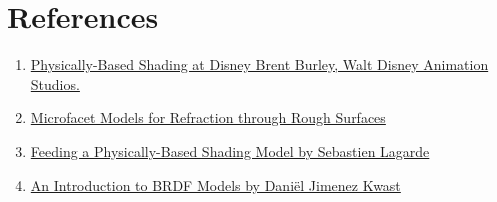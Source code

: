 \section{References}

\begin{enumerate}
\item \href{https://disney-animation.s3.amazonaws.com/library/s2012_pbs_disney_brdf_notes_v2.pdf}{Physically-Based Shading at Disney Brent Burley, Walt Disney Animation Studios.}
\item \href{http://www.cs.cornell.edu/~srm/publications/EGSR07-btdf.pdf}{Microfacet Models for Refraction through Rough Surfaces}
\item \href{http://seblagarde.wordpress.com/2011/08/17/feeding-a-physical-based-lighting-mode/}{Feeding a Physically-Based Shading Model by Sebastien Lagarde}
\item \href{http://hmi.ewi.utwente.nl/verslagen/capita-selecta/CS-Jimenez-Kwast-Daniel.pdf}{An Introduction to BRDF Models by Daniël Jimenez Kwast}
\end{enumerate}